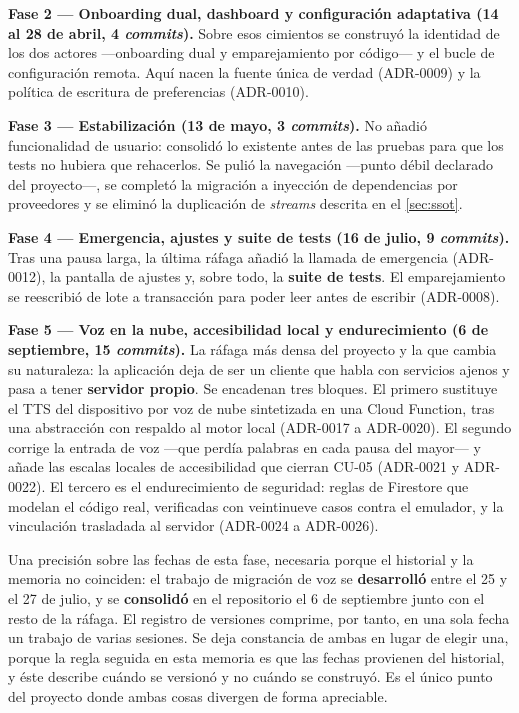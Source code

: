 \textbf{Fase 2 --- Onboarding dual, dashboard y configuración adaptativa (14 al 28 de abril, 4
\emph{commits}).} Sobre esos cimientos se construyó la identidad de los dos actores ---onboarding dual y
emparejamiento por código--- y el bucle de configuración remota. Aquí nacen la fuente única de verdad
(ADR-0009) y la política de escritura de preferencias (ADR-0010).

\textbf{Fase 3 --- Estabilización (13 de mayo, 3 \emph{commits}).} No añadió funcionalidad de usuario:
consolidó lo existente antes de las pruebas para que los tests no hubiera que rehacerlos. Se pulió la
navegación ---punto débil declarado del proyecto---, se completó la migración a inyección de dependencias
por proveedores y se eliminó la duplicación de \emph{streams} descrita en el \autoref{sec:ssot}.

\textbf{Fase 4 --- Emergencia, ajustes y suite de tests (16 de julio, 9 \emph{commits}).} Tras una pausa
larga, la última ráfaga añadió la llamada de emergencia (ADR-0012), la pantalla de ajustes y, sobre todo,
la \textbf{suite de tests}. El emparejamiento se reescribió de lote a transacción para poder leer antes de
escribir (ADR-0008).

\textbf{Fase 5 --- Voz en la nube, accesibilidad local y endurecimiento (6 de septiembre, 15
\emph{commits}).} La ráfaga más densa del proyecto y la que cambia su naturaleza: la aplicación deja de ser
un cliente que habla con servicios ajenos y pasa a tener \textbf{servidor propio}. Se encadenan tres
bloques. El primero sustituye el TTS del dispositivo por voz de nube sintetizada en una Cloud Function, tras
una abstracción con respaldo al motor local (ADR-0017 a ADR-0020). El segundo corrige la entrada de voz
---que perdía palabras en cada pausa del mayor--- y añade las escalas locales de accesibilidad que cierran
CU-05 (ADR-0021 y ADR-0022). El tercero es el endurecimiento de seguridad: reglas de Firestore que modelan
el código real, verificadas con veintinueve casos contra el emulador, y la vinculación trasladada al
servidor (ADR-0024 a ADR-0026).

Una precisión sobre las fechas de esta fase, necesaria porque el historial y la memoria no coinciden: el
trabajo de migración de voz se \textbf{desarrolló} entre el 25 y el 27 de julio, y se \textbf{consolidó} en
el repositorio el 6 de septiembre junto con el resto de la ráfaga. El registro de versiones comprime, por
tanto, en una sola fecha un trabajo de varias sesiones. Se deja constancia de ambas en lugar de elegir una,
porque la regla seguida en esta memoria es que las fechas provienen del historial, y éste describe cuándo se
versionó y no cuándo se construyó. Es el único punto del proyecto donde ambas cosas divergen de forma
apreciable.


